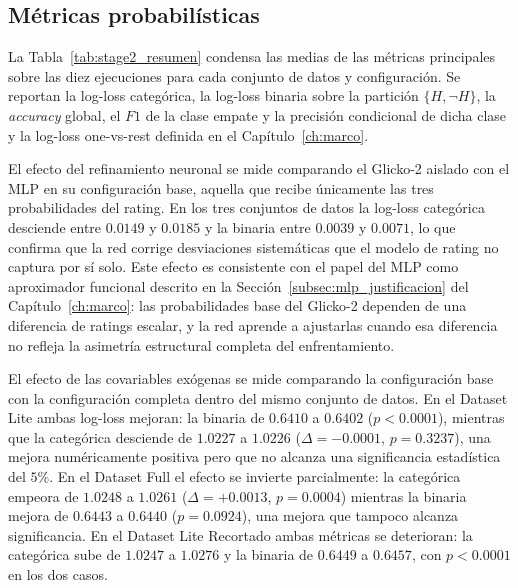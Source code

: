 \subsection{M\'etricas probabil\'isticas}
\label{subsec:res_mlp_prob}

La Tabla~\ref{tab:stage2_resumen} condensa las medias de las m\'etricas principales sobre las diez ejecuciones para cada conjunto de datos y configuraci\'on. Se reportan la log-loss categ\'orica, la log-loss binaria sobre la partici\'on $\{H, \neg H\}$, la \textit{accuracy} global, el $F1$ de la clase empate y la precisi\'on condicional de dicha clase y la log-loss one-vs-rest definida en el Cap\'itulo~\ref{ch:marco}.



El efecto del refinamiento neuronal se mide comparando el Glicko-2 aislado con el MLP en su configuraci\'on base, aquella que recibe \'unicamente las tres probabilidades del rating. En los tres conjuntos de datos la log-loss categ\'orica desciende entre $0{.}0149$ y $0{.}0185$ y la binaria entre $0{.}0039$ y $0{.}0071$, lo que confirma que la red corrige desviaciones sistem\'aticas que el modelo de rating no captura por s\'i solo. Este efecto es consistente con el papel del MLP como aproximador funcional descrito en la Secci\'on~\ref{subsec:mlp_justificacion} del Cap\'itulo~\ref{ch:marco}: las probabilidades base del Glicko-2 dependen de una diferencia de ratings escalar, y la red aprende a ajustarlas cuando esa diferencia no refleja la asimetr\'ia estructural completa del enfrentamiento.

El efecto de las covariables ex\'ogenas se mide comparando la configuraci\'on base con la configuraci\'on completa dentro del mismo conjunto de datos. En el Dataset Lite ambas log-loss mejoran: la binaria de $0{.}6410$ a $0{.}6402$ ($p<0{.}0001$), mientras que la categ\'orica desciende de $1{.}0227$ a $1{.}0226$ ($\Delta = -0{.}0001$, $p=0{.}3237$), una mejora num\'ericamente positiva pero que no alcanza una significancia estad\'istica del $5\%$. En el Dataset Full el efecto se invierte parcialmente: la categ\'orica empeora de $1{.}0248$ a $1{.}0261$ ($\Delta = +0{.}0013$, $p=0{.}0004$) mientras la binaria mejora de $0{.}6443$ a $0{.}6440$ ($p=0{.}0924$), una mejora que tampoco alcanza significancia. En el Dataset Lite Recortado ambas m\'etricas se deterioran: la categ\'orica sube de $1{.}0247$ a $1{.}0276$ y la binaria de $0{.}6449$ a $0{.}6457$, con $p<0{.}0001$ en los dos casos.

